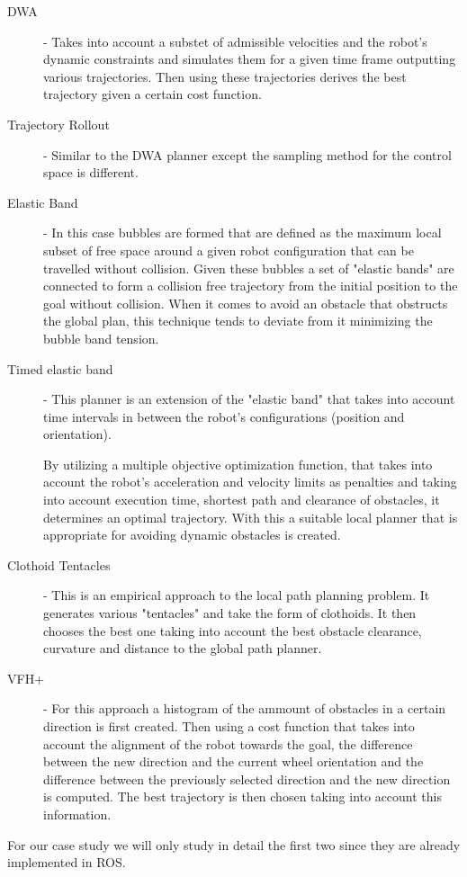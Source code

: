 \begin{description}
    \item [\ac{DWA}] -  \cite{foxdwa} Takes into account a substet of admissible velocities and the robot's dynamic constraints and simulates them for a given time frame outputting various trajectories. Then using these trajectories derives the best trajectory given a certain cost function.  
    \item [Trajectory Rollout]  \cite{gerkey2008planning} - Similar to the \ac{DWA} planner except the sampling method for the control space is different.
    \item [Elastic Band] - \cite{siegwart2011introduction} In this case bubbles are formed that are defined as the maximum local subset of free space around a given robot configuration that can be travelled without collision.
    Given these bubbles a set of "elastic bands" are connected to form a collision free trajectory from the initial position to the goal without collision. When it comes to avoid an obstacle that obstructs the global plan, this technique tends to deviate from it  minimizing the bubble band tension.
    \item [Timed elastic band] - \cite{rosmann2013efficient} This planner is an extension of the "elastic band" that takes into account time intervals in between the robot's configurations (position and orientation). 
    
    By utilizing a  multiple objective optimization function, that takes into account the robot's acceleration and velocity limits as penalties and  taking into account execution time, shortest path and clearance of obstacles, it determines an optimal trajectory. With this a suitable local planner that is appropriate for avoiding dynamic obstacles is created.
    
    \item [Clothoid Tentacles] -  \cite{ffalia2015local} This is an empirical approach to the local path planning problem. It generates various "tentacles" and take the form of clothoids. It then chooses the best one taking into account the best obstacle clearance, curvature and distance to the global path planner. 
    
    \item [\ac{VFH}+] \cite{siegwart2011introduction} - For this approach a histogram of the ammount of obstacles in a certain direction is first created. Then using a cost function that takes into account the alignment of the robot towards the goal, the difference between the new direction and the current wheel orientation and the difference between the previously selected direction and the new direction is computed. The best trajectory is then chosen taking into account this information.
    
\end{description}
For our case study we will only study in detail the first two since they are already implemented in ROS.
